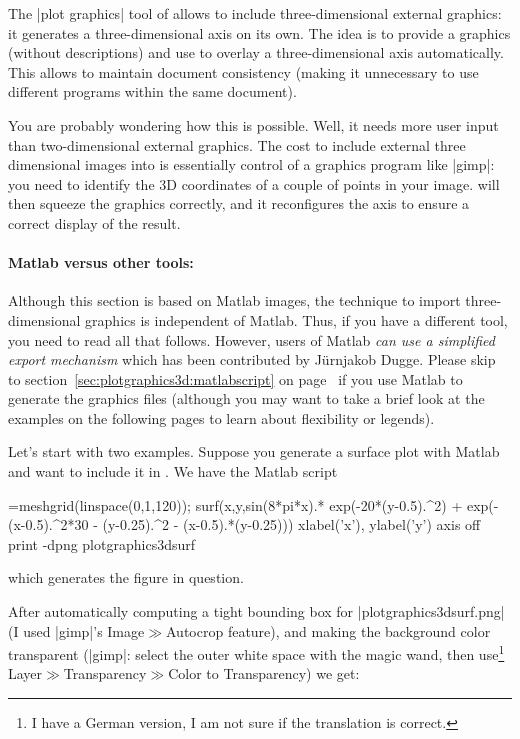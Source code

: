 {{The |plot graphics| tool of \PGFPlots{} allows to include three-dimensional
external graphics: it generates a three-dimensional axis on its own. The idea
is to provide a graphics (without descriptions) and use \PGFPlots{} to overlay
a three-dimensional axis automatically. This allows to maintain document
consistency (making it unnecessary to use different programs within the same
document).

You are probably wondering how this is possible. Well, it needs more user input
than two-dimensional external graphics. The cost to include external three
dimensional images into \PGFPlots{} is essentially control of a graphics
program like |gimp|: you need to identify the 3D coordinates of a couple of
points in your image. \PGFPlots{} will then squeeze the graphics correctly, and
it reconfigures the axis to ensure a correct display of the result.


\paragraph{Matlab versus other tools:}

Although this section is based on Matlab images, the technique to import
three-dimensional graphics is independent of Matlab. Thus, if you have a
different tool, you need to read all that follows. However, users of Matlab
\emph{can use a simplified export mechanism} which has been contributed by
J\"urnjakob Dugge. Please skip to section~\ref{sec:plotgraphics3d:matlabscript}
on page~\pageref{sec:plotgraphics3d:matlabscript} if you use Matlab to generate
the graphics files (although you may want to take a brief look at the examples
on the following pages to learn about flexibility or legends).

Let's start with two examples. Suppose you generate a surface plot with Matlab
and want to include it in \PGFPlots{}. We have the Matlab script
%
\begin{codeexample}=meshgrid(linspace(0,1,120));
surf(x,y,sin(8*pi*x).* exp(-20*(y-0.5).^2) + exp(-(x-0.5).^2*30 - (y-0.25).^2 - (x-0.5).*(y-0.25)))
xlabel('x'), ylabel('y')
axis off
print -dpng plotgraphics3dsurf
\end{codeexample}
%
\noindent which generates the figure in question.

After automatically computing a tight bounding box for |plotgraphics3dsurf.png|
(I used |gimp|'s Image$\gg$Autocrop feature), and making the background color
transparent (|gimp|: select the outer white space with the magic wand, then
use\footnote{I have a German version, I am not sure if the translation is
correct.} Layer$\gg$Transparency$\gg$Color to Transparency) we get:

}}

